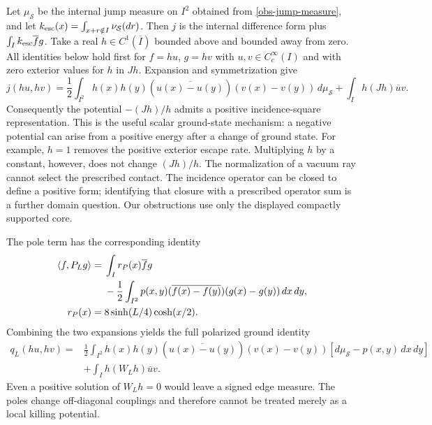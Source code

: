 Let $\mu_{\mathcal S}$ be the internal jump measure on $I^2$ obtained from
\eqref{obs-jump-measure}, and let
$k_{\rm esc}(x)=\int_{x+r\notin I}\nu_{\mathcal S}(dr)$.
Then $j$ is the internal difference form plus
$\int_I k_{\rm esc}\overline f g$.
Take a real $h\in C^1(\overline I)$ bounded above and bounded away from zero.
All identities below hold first for $f=hu$, $g=hv$ with
$u,v\in C_c^\infty(I)$ and with zero exterior values for $h$ in $Jh$.
Expansion and symmetrization give
\begin{equation}
 j(hu,hv)=\frac12\int_{I^2}h(x)h(y)
 (\overline{u(x)-u(y)})(v(x)-v(y))\,d\mu_{\mathcal S}
 +\int_I h(Jh)\overline u v.
 \label{obs-ground-identity}
\end{equation}
Consequently the potential $-(Jh)/h$ admits a positive incidence-square
representation.  This is the useful scalar ground-state mechanism: a
negative potential can arise from a positive energy after a change of
ground state.  For example, $h=1$ removes the positive exterior escape
rate.  Multiplying $h$ by a constant, however, does not change $(Jh)/h$.
The normalization of a vacuum ray cannot select the prescribed contact.
The incidence operator can be closed to define a positive form; identifying
that closure with a prescribed operator sum is a further domain question.
Our obstructions use only the displayed compactly supported core.

The pole term has the corresponding identity
\begin{equation}
\begin{aligned}
 \left\langle f,P_Lg\right\rangle={}&\int_I r_P(x)\overline f g\\
 &-\frac12\int_{I^2}p(x,y)
       (\overline{f(x)-f(y)})(g(x)-g(y))\,dx\,dy,\\
 r_P(x)={}&8\sinh(L/4)\cosh(x/2).
\end{aligned}
 \label{obs-pole-difference}
\end{equation}
Combining the two expansions yields the full polarized ground identity
\begin{equation}
 \begin{split}
 q_L(hu,hv)={}&\frac12\int_{I^2}h(x)h(y)
 (\overline{u(x)-u(y)})(v(x)-v(y))
 [d\mu_{\mathcal S}-p(x,y)\,dx\,dy]\\
 &+\int_I h(W_Lh)\overline u v.
 \end{split}
 \label{obs-signed-ground-identity}
\end{equation}
Even a positive solution of $W_Lh=0$ would leave a signed edge measure.
The poles change off-diagonal couplings and therefore cannot be treated
merely as a local killing potential.

